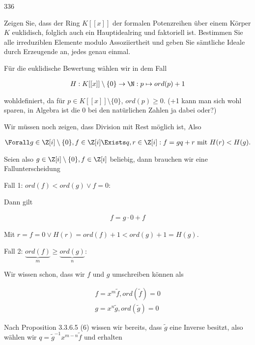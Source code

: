 \begin{algebraUE}{336}

Zeigen Sie, dass der Ring $K[[x]]$ der formalen Potenzreihen über einem Körper $K$ euklidisch, folglich auch ein Hauptidealring und faktoriell ist. Bestimmen Sie alle irreduziblen Elemente modulo Assoziiertheit und geben Sie sämtliche Ideale durch Erzeugende an, jedes genau einmal.

\end{algebraUE}

\begin{solution}

Für die euklidische Bewertung wählen wir in dem Fall

\begin{align*}
  H:K[[x]] \setminus \{0\} \to \N: p \mapsto ord(p)+1
\end{align*}

wohldefiniert, da für $p \in K[[x]] \setminus \{0\}$, $ord(p) \geq 0$. (+1 kann man sich wohl sparen, in Algebra ist die 0 bei den natürlichen Zahlen ja dabei oder?)

Wir müssen noch zeigen, dass Division mit Rest möglich ist, Also

\begin{align*}
  \Forall g \in \Z [i] \setminus \{0\}, f \in \Z [i] \Exists q,r \in \Z [i]: f = gq + r \text{~mit~} H(r) < H(g).
\end{align*}

Seien also $g \in \Z [i] \setminus \{0\}, f \in \Z [i]$ beliebig, dann brauchen wir eine Fallunterscheidung

Fall 1: $ord(f) < ord(g) \lor f = 0$:

Dann gilt

\begin{align*}
  f = g \cdot 0 + f
\end{align*}

Mit $r = f = 0 \lor H(r) = ord(f) + 1 < ord(g) + 1 = H(g)$.

Fall 2: $\underbrace{ord(f)}_{m} \geq \underbrace{ord(g)}_{n}$:

Wir wissen schon, dass wir $f$ und $g$ umschreiben können als

\begin{align*}
  f = x^m\tilde{f}, ord(\tilde{f}) = 0 \\
  g = x^n\tilde{g}, ord(\tilde{g}) = 0
\end{align*}

Nach Proposition 3.3.6.5 (6) wissen wir bereits, dass $\tilde{g}$ eine Inverse besitzt, also wählen wir $q = \tilde{g}^{-1}x^{m-n}\tilde{f}$ und erhalten


\end{solution}
